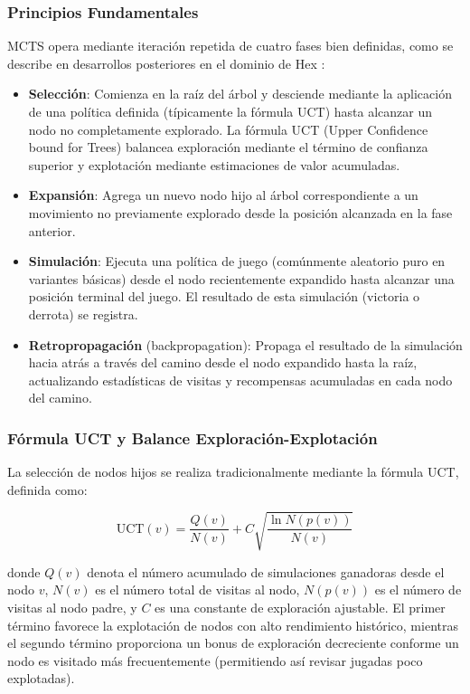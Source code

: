 \documentclass[12pt]{article}
\begin{document}
\subsubsection{Principios Fundamentales}

MCTS opera mediante iteración repetida de cuatro fases bien definidas, como se describe en desarrollos posteriores en el dominio de Hex \cite{Arneson2010}:

\begin{itemize}
\item \textbf{Selección}: Comienza en la raíz del árbol y desciende mediante la aplicación de una política definida (típicamente la fórmula UCT) hasta alcanzar un nodo no completamente explorado. La fórmula UCT (Upper Confidence bound for Trees) balancea exploración mediante el término de confianza superior y explotación mediante estimaciones de valor acumuladas.

\item \textbf{Expansión}: Agrega un nuevo nodo hijo al árbol correspondiente a un movimiento no previamente explorado desde la posición alcanzada en la fase anterior.

\item \textbf{Simulación}: Ejecuta una política de juego (comúnmente aleatorio puro en variantes básicas) desde el nodo recientemente expandido hasta alcanzar una posición terminal del juego. El resultado de esta simulación (victoria o derrota) se registra.

\item \textbf{Retropropagación} (backpropagation): Propaga el resultado de la simulación hacia atrás a través del camino desde el nodo expandido hasta la raíz, actualizando estadísticas de visitas y recompensas acumuladas en cada nodo del camino.

\end{itemize}

\subsubsection{Fórmula UCT y Balance Exploración-Explotación}

La selección de nodos hijos se realiza tradicionalmente mediante la fórmula UCT, definida como:

\begin{equation}
\text{UCT}(v) = \frac{Q(v)}{N(v)} + C \sqrt{\frac{\ln N(p(v))}{N(v)}}
\end{equation}

donde $Q(v)$ denota el número acumulado de simulaciones ganadoras desde el nodo $v$, $N(v)$ es el número total de visitas al nodo, $N(p(v))$ es el número de visitas al nodo padre, y $C$ es una constante de exploración ajustable. El primer término favorece la explotación de nodos con alto rendimiento histórico, mientras el segundo término proporciona un bonus de exploración decreciente conforme un nodo es visitado más frecuentemente (permitiendo así revisar jugadas poco explotadas).
\end{document}
